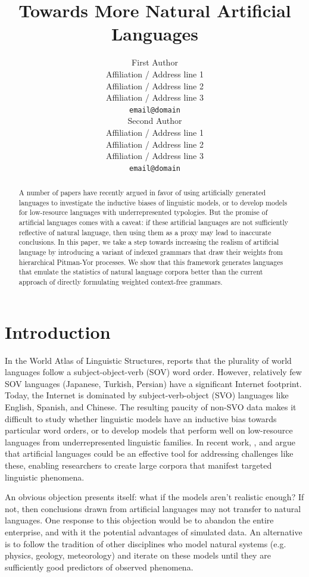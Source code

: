 \documentclass[11pt]{article}
\title{Towards More Natural Artificial Languages}
\author{First Author \\
  Affiliation / Address line 1 \\
  Affiliation / Address line 2 \\
  Affiliation / Address line 3 \\
  \texttt{email@domain} \\\And
  Second Author \\
  Affiliation / Address line 1 \\
  Affiliation / Address line 2 \\
  Affiliation / Address line 3 \\
  \texttt{email@domain} \\}
\begin{document}
\maketitle
\begin{abstract}
A number of papers have recently argued in favor of using artificially generated languages to investigate the inductive biases of linguistic models, or to develop models for low-resource languages with underrepresented typologies. But the promise of artificial languages comes with a caveat: if these artificial languages are not sufficiently reflective of natural language, then using them as a proxy may lead to inaccurate conclusions. In this paper, we take a step towards increasing the realism of artificial language by introducing a variant of indexed grammars that draw their weights from hierarchical Pitman-Yor processes. We show that this framework generates languages that emulate the statistics of natural language corpora better than the current approach of directly formulating weighted context-free grammars. 
\end{abstract}

\section{Introduction}

In the World Atlas of Linguistic Structures, \citet{wals81} reports that the plurality of world languages follow a subject-object-verb (SOV) word order. However, relatively few SOV languages (Japanese, Turkish, Persian) have a significant Internet footprint. Today, the Internet is dominated by subject-verb-object (SVO) languages like English, Spanish, and Chinese. The resulting paucity of non-SVO data makes it difficult to study whether linguistic models have an inductive bias towards particular word orders, or to develop models that perform well on low-resource languages from underrepresented linguistic families. In recent work, \citet{wang-eisner-2016-galactic}, \citet{ravfogel-etal-2019-studying} and \citet{white-cotterell-2021-examining} argue that artificial languages could be an effective tool for addressing challenges like these, enabling researchers to create large corpora that manifest targeted linguistic phenomena.

An obvious objection presents itself: what if the models aren't realistic enough? If not, then conclusions drawn from artificial languages may not transfer to natural languages. One response to this objection would be to abandon the entire enterprise, and with it the potential advantages of simulated data. An alternative is to follow the tradition of other disciplines who model natural systems (e.g. physics, geology, meteorology) and iterate on these models until they are sufficiently good predictors of observed phenomena.
\end{document}
